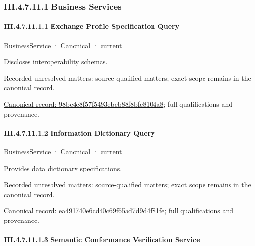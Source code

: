 \subsubsection*{III.4.7.11.1 Business Services}
\label{navigation:III.4.7.11.1}

\paragraph*{III.4.7.11.1.1 Exchange Profile Specification Query}
\label{navigation:III.4.7.11.1.1}

\label{element:98bc4e8f57f5493ebeb88f8bfc8104a8}
{\small BusinessService · Canonical · current}\par

Discloses interoperability schemas.


{\small Recorded unresolved matters: source-qualified matters; exact scope remains in the canonical record.}\par
{\footnotesize \href{../../../../../../../continuum/business/business-service/98bc4e8f57f5493ebeb88f8bfc8104a8.md}{Canonical record: 98bc4e8f57f5493ebeb88f8bfc8104a8}; full qualifications and provenance.}\par
\paragraph*{III.4.7.11.1.2 Information Dictionary Query}
\label{navigation:III.4.7.11.1.2}

\label{element:ea491740e6cd40c69f65ad7d9d4f81fe}
{\small BusinessService · Canonical · current}\par

Provides data dictionary specifications.


{\small Recorded unresolved matters: source-qualified matters; exact scope remains in the canonical record.}\par
{\footnotesize \href{../../../../../../../continuum/business/business-service/ea491740e6cd40c69f65ad7d9d4f81fe.md}{Canonical record: ea491740e6cd40c69f65ad7d9d4f81fe}; full qualifications and provenance.}\par
\paragraph*{III.4.7.11.1.3 Semantic Conformance Verification Service}
\label{navigation:III.4.7.11.1.3}

